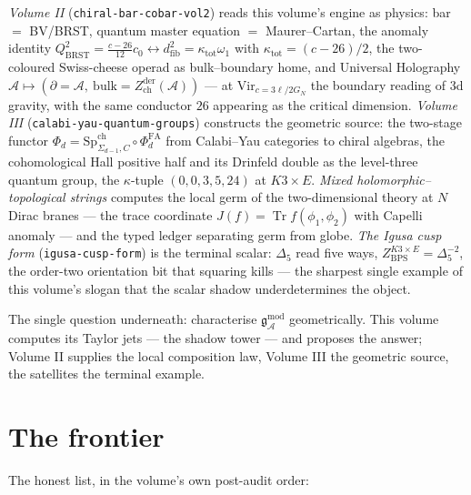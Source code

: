 \documentclass[11pt]{article}
\providecommand{\cA}{\mathcal{A}}
\providecommand{\fg}{\mathfrak{g}}
\providecommand{\Vir}{\mathrm{Vir}}
\providecommand{\Zder}{Z^{\mathrm{der}}_{\mathrm{ch}}}
\providecommand{\SpCh}{\mathrm{Sp}^{\mathrm{ch}}}
\providecommand{\Dfive}{\Delta_5}
\providecommand{\Tr}{\operatorname{Tr}}
\begin{document}
\emph{Volume II} (\texttt{chiral-bar-cobar-vol2}) reads this volume's
engine as physics: bar $=$ BV/BRST, quantum master equation $=$
Maurer--Cartan, the anomaly identity
$Q^2_{\mathrm{BRST}}=\frac{c-26}{12}c_0\leftrightarrow
d^2_{\mathrm{fib}}=\kappa_{\mathrm{tot}}\omega_1$ with
$\kappa_{\mathrm{tot}}=(c-26)/2$, the two-coloured Swiss-cheese
operad as bulk--boundary home, and Universal Holography
$\cA\mapsto(\partial=\cA,\ \mathrm{bulk}=\Zder(\cA))$ --- at
$\Vir_{c=3\ell/2G_N}$ the boundary reading of 3d gravity, with the
same conductor $26$ appearing as the critical dimension.
\emph{Volume III} (\texttt{calabi-yau-quantum-groups}) constructs the
geometric source: the two-stage functor
$\Phi_d=\SpCh_{\Sigma_{d-1},C}\circ\Phi^{\mathrm{FA}}_d$ from
Calabi--Yau categories to chiral algebras, the cohomological Hall
positive half and its Drinfeld double as the level-three quantum
group, the $\kappa$-tuple $(0,0,3,5,24)$ at $K3\times E$.
\emph{Mixed holomorphic--topological strings} computes the local germ
of the two-dimensional theory at $N$ Dirac branes --- the trace
coordinate $J(f)=\Tr f(\phi_1,\phi_2)$ with Capelli anomaly --- and
the typed ledger separating germ from globe. \emph{The Igusa cusp
form} (\texttt{igusa-cusp-form}) is the terminal scalar: $\Dfive$
read five ways, $Z^{K3\times E}_{\mathrm{BPS}}=\Dfive^{-2}$, the
order-two orientation bit that squaring kills --- the sharpest single
example of this volume's slogan that the scalar shadow underdetermines
the object.

The single question underneath: characterise
$\fg^{\mathrm{mod}}_\cA$ geometrically. This volume computes its
Taylor jets --- the shadow tower --- and proposes the answer; Volume
II supplies the local composition law, Volume III the geometric
source, the satellites the terminal example.

\section{The frontier}\label{sec:frontier}

The honest list, in the volume's own post-audit order:
\end{document}
